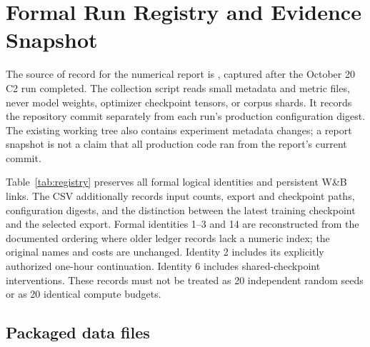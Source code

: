 \appendix
\section{Formal Run Registry and Evidence Snapshot}
\label{app:registry}

The source of record for the numerical report is , captured after the October 20 C2 run completed. The collection script reads small metadata and metric files, never model weights, optimizer checkpoint tensors, or corpus shards. It records the repository commit separately from each run's production configuration digest. The existing working tree also contains experiment metadata changes; a report snapshot is not a claim that all production code ran from the report's current commit.

Table~\ref{tab:registry} preserves all formal logical identities and persistent W\&B links. The CSV additionally records input counts, export and checkpoint paths, configuration digests, and the distinction between the latest training checkpoint and the selected export. Formal identities 1--3 and 14 are reconstructed from the documented ordering where older ledger records lack a numeric index; the original names and costs are unchanged. Identity 2 includes its explicitly authorized one-hour continuation. Identity 6 includes shared-checkpoint interventions. These records must not be treated as 20 independent random seeds or as 20 identical compute budgets.

\begingroup\footnotesize

\endgroup

\subsection{Packaged data files}
\label{app:evidence}


